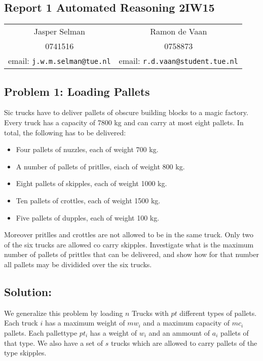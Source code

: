 \documentclass[12pt]{article}
\begin{document}
\begin{center}
\section*{Report 1 Automated Reasoning 2IW15 }
\end{center}
\begin{center}
\begin{tabular}{c c}
Jasper Selman & Ramon de Vaan\\
0741516 & 0758873\\
email: {\tt j.w.m.selman@tue.nl} & email: {\tt r.d.vaan@student.tue.nl}
\end{tabular}
\end{center}

\vspace{8mm}

\subsection*{Problem 1: Loading Pallets}

Sic trucks have to deliver pallets of obscure building blocks to a magic factory. Every truck has a capacity of 7800 kg and can carry at most eight pallets. In total, the following has to be delivered:
\begin{itemize}
\item Four pallets of nuzzles, each of weight 700 kg.
\item A number of pallets of pritlles, eiach of weight 800 kg.
\item Eight pallets of skipples, each of weight 1000 kg.
\item Ten pallets of crottles, each of weight 1500 kg.
\item Five pallets of dupples, each of weight 100 kg.
\end{itemize}
Moreover pritlles and crottles are not allowed to be in the same truck. Only two of the six trucks are allowed co carry skipples. Investigate what is the maximum number of pallets of prittles that can be delivered, and show how for that number all pallets may be dividided over the six trucks. 

\vspace{8mm}

\subsection*{Solution:}
We generalize this problem by loading $n$ Trucks with $pt$ different types of pallets. Each truck $i$ has a maximum weight of $mw_i$ and a maximum capacity of $mc_i$ pallets. Each pallettype $pt_i$ has a weight of $w_i$ and an ammount of $a_i$ pallets of that type. We also have a set of $s$ trucks which are allowed to carry pallets of the type skipples.
\end{document}
